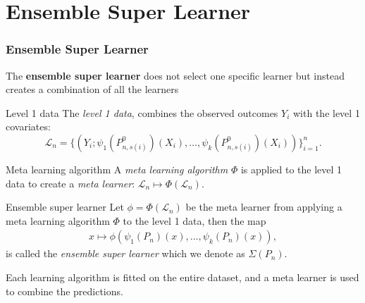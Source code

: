\documentclass{beamer}
\newcommand{\ml}{k}
\newcommand{\la}{\psi}
\newcommand{\lone}{\mathcal{L}}
\newcommand{\meta}{\phi}
\newcommand{\Meta}{\Phi}
\newcommand{\esl}{\Sigma}
\begin{document}
\section{Ensemble Super Learner}
\begin{frame}
  \frametitle{Ensemble Super Learner}
  The \textbf{ensemble super learner} does not select one specific learner but instead creates a combination of all the learners 
    \begin{block}{Level 1 data}
      The \textit{level 1 data},
      combines the observed outcomes $ Y_i $ with the level 1 covariates:
    \begin{equation*}
        \lone_{n}= \{(Y_i; \la_1(P_{n, s(i)}^{0})(X_i), \ldots, \la_\ml(P_{n, s(i)}^{0})(X_i)) \}_{i = 1}^n. 
    \end{equation*}
  \end{block}
  \vfill
    \begin{block}{Meta learning algorithm}
        A \textit{meta learning algorithm} $ \Meta $ is applied to the level 1 data to create a \textit{meta learner}: $ \lone_{n} \mapsto \Meta(\lone_{n})$. 
    \end{block}



\end{frame}
\begin{frame}
    \begin{block}{Ensemble super learner}
    Let $ \meta = \Meta(\lone_{n}) $ be the meta learner from applying a meta learning algorithm $ \Meta $ to the level 1 data, then the map 
    \begin{align*}
       x \mapsto \meta(\la_1(P_{n})(x), \ldots, \la_k(P_{n})(x) ),
    \end{align*}
    is called the \textit{ensemble super learner} which we denote as $ \esl(P_n) $.%
  \end{block}
  \vfill
Each learning algorithm is fitted on the entire dataset, and a meta learner is used to combine the predictions.


\end{frame}
\end{document}

